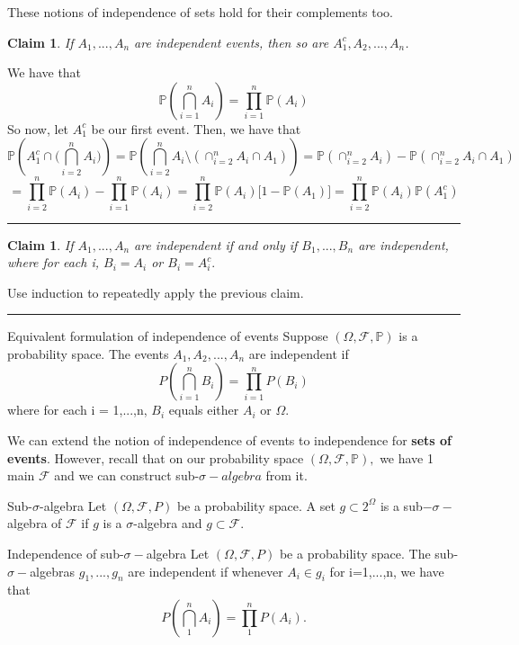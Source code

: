 \documentclass[twoside]{article}
\newtheorem{claim}[theorem]{Claim}
\newenvironment{proof}{{\bf Proof:}}{\hfill\rule{2mm}{2mm}}
\newcommand{\sigmalgebra}{\mathcal{F}}
\newcommand{\sa}{\sigma-algebra}
\newcommand{\prob}{\mathbb{P}}
\begin{document}
These notions of independence of sets hold for their complements too.
\begin{claim}If $A_1,...,A_n$ are independent events, then so are $A_1^c,A_2,...,A_n$.
\end{claim}

\begin{proof} We have that 
$$
\prob(\bigcap_{i=1}^{n}A_i) = \prod_{i=1}^{n}\prob(A_i)
$$
So now, let $A_1^c$ be our first event. Then, we have that 
$$
\prob(A_1^c \cap \bigg( \bigcap_{i=2}^{n} A_i \bigg) ) = \prob(\bigcap_{i=2}^{n}A_i \setminus (\cap_{i=2}^{n}A_i \cap A_1)) = \prob(\cap_{i=2}^{n}A_i) - \prob(\cap_{i=2}^{n}A_i \cap A_1)
$$
$$
= \prod_{i=2}^{n}\prob(A_i) - \prod_{i=1}^{n}\prob(A_i) = \prod_{i=2}^{n}\prob(A_i)\bigg[1 - \prob(A_1) \bigg] = \prod_{i=2}^{n}\prob(A_i)\prob(A_1^c)
$$
\end{proof}

\begin{claim}If $A_1,...,A_n$ are independent if and only if $B_1,...,B_n$ are independent, where for each i, $B_i = A_i$ or $B_i = A_i^c.$
\end{claim}

\begin{proof} Use induction to repeatedly apply the previous claim.
\end{proof}

\begin{proposition_exam}{Equivalent formulation of independence of events}{} Suppose $(\Omega, \sigmalgebra, \prob)$ is a probability space. The events $A_1,A_2,...,A_n$ are independent if 
$$
P(\bigcap_{i=1}^n B_i) = \prod_{i=1}^nP(B_i)
$$
where for each i = 1,...,n, $B_i$ equals either $A_i$ or $\Omega.$
\end{proposition_exam}



We can extend the notion of independence of events to independence for \textbf{sets of events}. However, recall that on our probability space $(\Omega, \sigmalgebra, \prob),$ we have 1 main $\sigmalgebra$ and we can construct sub-$\sa$ from it.


\begin{definition_exam}{Sub-$\sigma$-algebra}{} Let $(\Omega, \mathcal{F}, P)$ be a probability space. A set $g \subset 2^{\Omega}$ is a sub$-\sigma-$algebra of $\mathcal{F}$ if $g$ is a $\sigma$-algebra and $g \subset \mathcal{F}.$
\end{definition_exam}


\begin{definition_exam}{Independence of sub-$\sigma-$algebra}{} Let $(\Omega, \mathcal{F}, P)$ be a probability space. The sub-$\sigma-$algebras $g_1,...,g_n$ are independent if whenever $A_i \in g_i$ for i=1,...,n, we have that 
$$
P(\bigcap_{1}^nA_i) = \prod_{1}^nP(A_i).
$$
\end{definition_exam}
\end{document}
